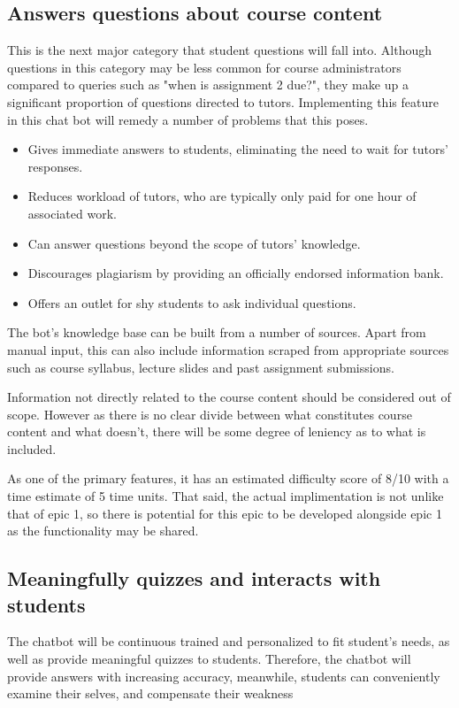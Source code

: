 \documentclass{article}
\begin{document}
\subsection{Answers questions about course content}
This is the next major category that student questions will fall into. Although questions in this category may be less common for course administrators compared to queries such as "when is assignment 2 due?", they make up a significant proportion of questions directed to tutors. Implementing this feature in this chat bot will remedy a number of problems that this poses.

\begin{itemize}
  \item Gives immediate answers to students, eliminating the need to wait for tutors' responses.
  \item Reduces workload of tutors, who are typically only paid for one hour of associated work.
  \item Can answer questions beyond the scope of tutors' knowledge.
  \item Discourages plagiarism by providing an officially endorsed information bank.
  \item Offers an outlet for shy students to ask individual questions.
\end{itemize}

The bot's knowledge base can be built from a number of sources. Apart from manual input, this can also include information scraped from appropriate sources such as course syllabus, lecture slides and past assignment submissions.

Information not directly related to the course content should be considered out of scope. However as there is no clear divide between what constitutes course content and what doesn't, there will be some degree of leniency as to what is included.

As one of the primary features, it has an estimated difficulty score of 8/10 with a time estimate of 5 time units. That said, the actual implimentation is not unlike that of epic 1, so there is potential for this epic to be developed alongside epic 1 as the functionality may be shared.


\subsection{Meaningfully quizzes and interacts with students}
The chatbot will be continuous trained and personalized to fit student’s needs, as well as provide meaningful quizzes to students. Therefore, the chatbot will provide answers with increasing accuracy, meanwhile, students can conveniently examine their selves, and compensate their weakness
\end{document}
